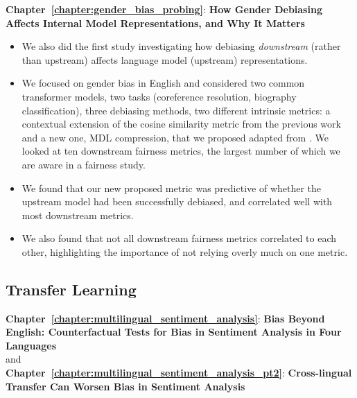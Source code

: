 \textbf{Chapter~\ref{chapter:gender_bias_probing}}: \textbf{How Gender Debiasing Affects Internal Model Representations, and Why It Matters}

\begin{itemize}
    \item We also did the first study investigating how debiasing \textit{downstream} (rather than upstream) affects language model (upstream) representations.
    \item We focused on gender bias in English and considered two common transformer models, two tasks (coreference resolution, biography classification), three debiasing methods, two different intrinsic metrics: a contextual extension of the cosine similarity metric from the previous work and a new one, MDL compression, that we proposed adapted from \citet{voita-titov-2020-information}. We looked at ten downstream fairness metrics, the largest number of which we are aware in a fairness study.
    \item We found that our new proposed metric was predictive of whether the upstream model had been successfully debiased, and correlated well with most downstream metrics.
    \item We also found that not all downstream fairness metrics correlated to each other, highlighting the importance of not relying overly much on one metric. 
\end{itemize}


\subsection{Transfer Learning}
\textbf{Chapter~\ref{chapter:multilingual_sentiment_analysis}}: \textbf{Bias Beyond English: Counterfactual Tests for Bias in Sentiment Analysis
in Four Languages} \\
and \\
\textbf{Chapter~\ref{chapter:multilingual_sentiment_analysis_pt2}}: \textbf{Cross-lingual Transfer Can Worsen Bias in Sentiment Analysis}

